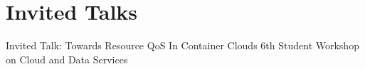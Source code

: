 \section{Invited Talks}
		{\newline Invited Talk: Towards Resource QoS In Container Clouds}
		{}{}{6th Student Workshop on Cloud and Data Services}

